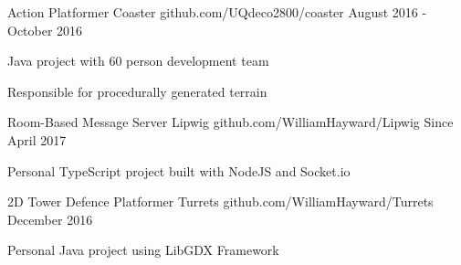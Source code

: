 


\begin{cventries}


\cventry
{Action Platformer} %
{Coaster} %
{github.com/UQdeco2800/coaster} %
{August 2016 - October 2016} %
{ %
\begin{cvitems}
\item Java project with 60 person development team
\item Responsible for procedurally generated terrain
\end{cvitems}
}


\cventry
{Room-Based Message Server} %
{Lipwig} %
{github.com/WilliamHayward/Lipwig} %
{Since April 2017} %
{ %
\begin{cvitems}
\item Personal TypeScript project built with NodeJS and Socket.io
\end{cvitems}
}


\cventry
{2D Tower Defence Platformer} %
{Turrets} %
{github.com/WilliamHayward/Turrets} %
{December 2016} %
{ %
\begin{cvitems}
\item Personal Java project using LibGDX Framework
\end{cvitems}
}


\end{cventries}